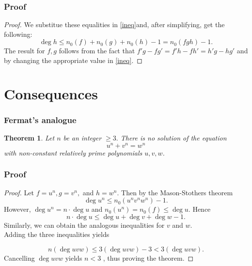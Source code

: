 \documentclass[envcountsect]{beamer}
\newtheorem*{theorem*}{Theorem}
\begin{document}
\begin{frame}
  \frametitle{Proof}
  \begin{proof}
We substitue these equalities in \eqref{ineq}and, after simplifying, get the
following:
\[
 \operatorname{deg}h \leq n_0(f) + n_0(g) + n_0(h) - 1 = n_0(fgh) - 1.
\]
The result for $f,g$ follows from the fact that $f'g - fg' = f'h - fh' =
h'g-hg'$ and by changing the appropriate value in \eqref{ineq}.

  \end{proof}
\end{frame}

\section{Consequences}
\begin{frame}
\frametitle{Fermat's analogue} 
\begin{theorem*}
Let $n$ be an integer $\geq 3.$ There is no solution of the equation \[u^n +
  v^n = w^n\] with non-constant relatively prime polynomials $u,v,w$. 
\end{theorem*}



\end{frame}

\begin{frame}
  \frametitle{Proof}

  \begin{proof}
    \small
    Let $f =u^n, g = v^n,$ and $h=w^n.$ Then by the Mason-Stothers theorem
    \[
      \operatorname{deg}u^n \leq n_0(u^nv^nw^n) - 1.
    \]
    However, $\operatorname{deg}u^n=n \cdot \operatorname{deg}u$ and $n_0(u^n) =
    n_0(f) \leq \operatorname{deg}u.$ Hence 
\[
  n \cdot \operatorname{deg}u \leq \operatorname{deg}u + \operatorname{deg}v +
  \operatorname{deg}w - 1.
\]
   Similarly, we can obtain the analogous inequalities for $v$ and $w.$ \\
Adding the three inequalities yields

\[
  n(\operatorname{deg}uvw) \leq 3(\operatorname{deg}uvw) -3 < 3(\operatorname{deg}uvw).
\]
Cancelling $\operatorname{deg}uvw$ yields $ n < 3$ , thus proving the theorem.
\end{proof}
\end{frame}
\end{document}
